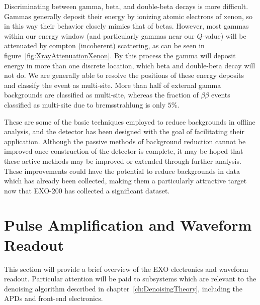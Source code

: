Discriminating between gamma, beta, and double-beta decays is more difficult.  Gammas generally deposit their energy by ionizing atomic electrons of xenon, so in this way their behavior closely mimics that of betas.  However, most gammas within our energy window (and particularly gammas near our $Q$-value) will be attenuated by compton (incoherent) scattering, as can be seen in figure~\ref{fig:XrayAttenuationXenon}.  By this process the gamma will deposit energy in more than one discrete location, which beta and double-beta decay will not do.  We are generally able to resolve the positions of these energy deposits and classify the event as multi-site. More than half of external gamma backgrounds are classified as multi-site, whereas the fraction of $\beta\beta$ events classified as multi-site due to bremsstrahlung is only $5\%$.~\cite{bb2nEXO2014}

These are some of the basic techniques employed to reduce backgrounds in offline analysis, and the detector has been designed with the goal of facilitating their application.  Although the passive methods of background reduction cannot be improved once construction of the detector is complete, it may be hoped that these active methods may be improved or extended through further analysis.  These improvements could have the potential to reduce backgrounds in data which has already been collected, making them a particularly attractive target now that EXO-200 has collected a significant dataset.

\section{Pulse Amplification and Waveform Readout}\label{sec:DetectorReadout}

This section will provide a brief overview of the EXO electronics and waveform readout.  Particular attention will be paid to subsystems which are relevant to the denoising algorithm described in chapter~\ref{ch:DenoisingTheory}, including the APDs and front-end electronics.

